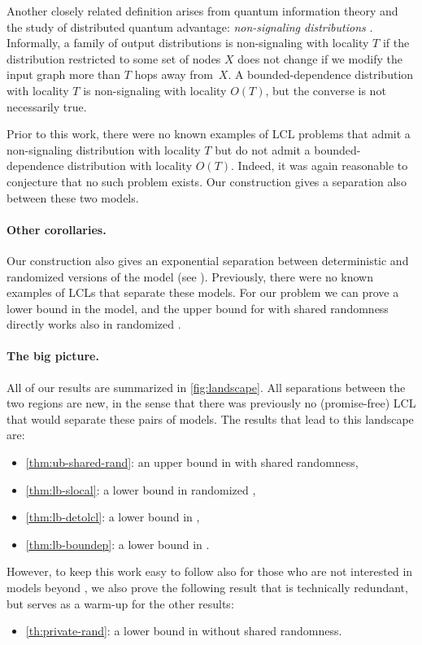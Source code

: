 \documentclass[11pt]{article}
\begin{document}
Another closely related definition arises from quantum information theory and
the study of distributed quantum advantage: \emph{non-signaling distributions}
\cite{akbari24_online_arxiv,gavoille2009,arfaoui2014,coiteux-roy24quantum-coloring}.
Informally, a family of output distributions is non-signaling with locality $T$
if the distribution restricted to some set of nodes $X$ does not change if we
modify the input graph more than $T$ hops away from~$X$. A bounded-dependence
distribution with locality $T$ is non-signaling with locality $O(T)$, but the
converse is not necessarily true.

Prior to this work, there were no known examples of LCL problems that admit a
non-signaling distribution with locality $T$ but do not admit a
bounded-dependence distribution with locality $O(T)$. Indeed, it was again
reasonable to conjecture that no such problem exists. Our construction gives a
separation also between these two models.

\paragraph{Other corollaries.}

Our construction also gives an exponential separation between deterministic and
randomized versions of the \onlinelocal model (see
\cite{akbari24_online_arxiv,akbari23_locality_icalp}). Previously, there were no
known examples of LCLs that separate these models. For our problem we can prove
a lower bound in the \detolcl model, and the upper bound for \randlcl with
shared randomness directly works also in randomized \onlinelocal.

\paragraph{The big picture.}

All of our results are summarized in \cref{fig:landscape}. All separations between the two regions are new, in the sense that there was previously no (promise-free) LCL that would separate these pairs of models. The results that lead to this landscape are:
\begin{itemize}[noitemsep]
	\item \cref{thm:ub-shared-rand}: an upper bound in \randlcl with shared randomness,
	\item \cref{thm:lb-slocal}: a lower bound in randomized \slocal,
	\item \cref{thm:lb-detolcl}: a lower bound in \detolcl,
	\item \cref{thm:lb-boundep}: a lower bound in \boundep.
\end{itemize}
However, to keep this work easy to follow also for those who are not interested in models beyond \randlcl, we also prove the following result that is technically redundant, but serves as a warm-up for the other results:
\begin{itemize}[noitemsep]
	\item \cref{th:private-rand}: a lower bound in \randlcl without shared randomness.
\end{itemize}
\end{document}
